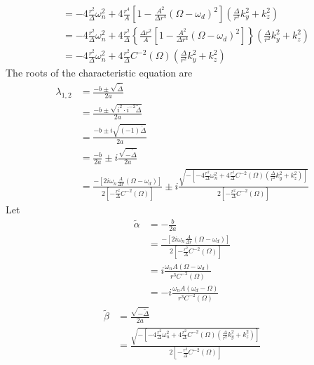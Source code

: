 \documentclass[english]{article}
\begin{document}
\begin{align*}
 & =-4\frac{r^{2}}{\Delta}\omega^{2}_{n}+4\frac{r^{4}}{A}\left[1-\frac{A^{2}}{\Delta r^{4}}\left(\Omega-\omega_{d}\right)^{2}\right]\left(\frac{\Delta}{r^{2}}k^{2}_{y}+k^{2}_{z}\right)\\
 & =-4\frac{r^{2}}{\Delta}\omega^{2}_{n}+4\frac{r^{2}}{\Delta}\left\{ \frac{\Delta r^{2}}{A}\left[1-\frac{A^{2}}{\Delta r^{4}}\left(\Omega-\omega_{d}\right)^{2}\right]\right\} \left(\frac{\Delta}{r^{2}}k^{2}_{y}+k^{2}_{z}\right)\\
 & =-4\frac{r^{2}}{\Delta}\omega^{2}_{n}+4\frac{r^{2}}{\Delta}C^{-2}\left(\Omega\right)\left(\frac{\Delta}{r^{2}}k^{2}_{y}+k^{2}_{z}\right)
\end{align*}
 The roots of the characteristic equation are 
\begin{align*}
\lambda_{1,2} & =\frac{-b\pm\sqrt{\tilde{\Delta}}}{2a}\\
 & =\frac{-b\pm\sqrt{i^{2}\cdot i^{-2}\tilde{\Delta}}}{2a}\\
 & =\frac{-b\pm i\sqrt{\left(-1\right)\tilde{\Delta}}}{2a}\\
 & =\frac{-b}{2a}\pm i\frac{\sqrt{-\tilde{\Delta}}}{2a}\\
 & =\frac{-\left[2i\omega_{n}\frac{A}{\Delta r}\left(\Omega-\omega_{d}\right)\right]}{2\left[-\frac{r^{2}}{\Delta}C^{-2}\left(\Omega\right)\right]}\pm i\frac{\sqrt{-\left[-4\frac{r^{2}}{\Delta}\omega^{2}_{n}+4\frac{r^{2}}{\Delta}C^{-2}\left(\Omega\right)\left(\frac{\Delta}{r^{2}}k^{2}_{y}+k^{2}_{z}\right)\right]}}{2\left[-\frac{r^{2}}{\Delta}C^{-2}\left(\Omega\right)\right]}
\end{align*}
 Let 
\begin{align*}
\tilde{\alpha} & =-\frac{b}{2a}\\
 & =\frac{-\left[2i\omega_{n}\frac{A}{\Delta r}\left(\Omega-\omega_{d}\right)\right]}{2\left[-\frac{r^{2}}{\Delta}C^{-2}\left(\Omega\right)\right]}\\
 & =i\frac{\omega_{n}A\left(\Omega-\omega_{d}\right)}{r^{3}C^{-2}\left(\Omega\right)}\\
 & =-i\frac{\omega_{n}A\left(\omega_{d}-\Omega\right)}{r^{3}C^{-2}\left(\Omega\right)}
\end{align*}
 {}
\begin{align*}
\tilde{\beta} & =\frac{\sqrt{-\tilde{\Delta}}}{2a}\\
 & =\frac{\sqrt{-\left[-4\frac{r^{2}}{\Delta}\omega^{2}_{n}+4\frac{r^{2}}{\Delta}C^{-2}\left(\Omega\right)\left(\frac{\Delta}{r^{2}}k^{2}_{y}+k^{2}_{z}\right)\right]}}{2\left[-\frac{r^{2}}{\Delta}C^{-2}\left(\Omega\right)\right]}
\end{align*}
\end{document}
